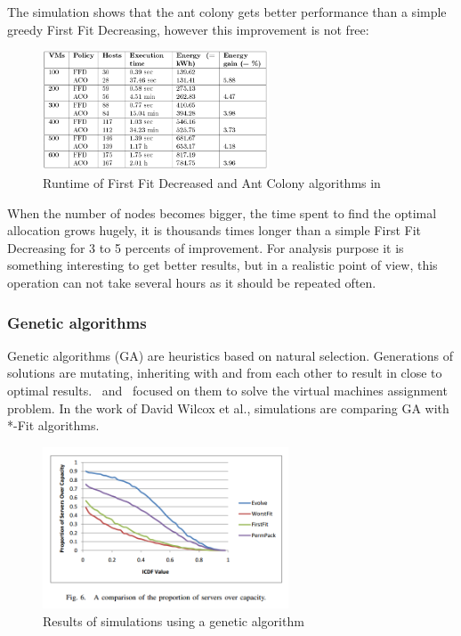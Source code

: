 The simulation shows that the ant colony gets better performance than a simple greedy First
Fit Decreasing, however this improvement is not free:

\begin{figure}[H]
\begin{center}
	\includegraphics[width=0.6\textwidth]{./Images/antcolonyruntime.png}
	\caption{Runtime of First Fit Decreased and Ant Colony algorithms in~\cite{algoAntcolony2}}
\end{center}
\end{figure}

When the number of nodes becomes bigger, the time spent to find the optimal
allocation grows hugely, it is thousands times longer than a simple First Fit
Decreasing for 3 to 5 percents of improvement. For analysis purpose it is
something interesting to get better results, but in a realistic point of view,
this operation can not take several hours as it should be repeated often.

\subsubsection{Genetic algorithms}

Genetic algorithms (GA) are heuristics based on natural selection. Generations
of solutions are mutating, inheriting with and from each other to result in
close to optimal results.~\cite{algoGenetics1} and~\cite{algoGenetics2}
focused on them to solve the virtual machines assignment problem. In the work
of David Wilcox et al.\cite{algoGenetics1}, simulations are comparing GA with
*-Fit algorithms.

\begin{figure}[b!]
\begin{center}
	\includegraphics[width=0.65\textwidth]{./Images/geneticperf1.png}
	\caption{Results of simulations using a genetic algorithm\cite{algoGenetics1}}
\end{center}
\end{figure}

